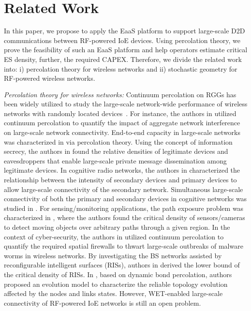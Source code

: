 \section{Related Work}
In this paper, we propose to apply the EaaS platform to support large-scale D2D communications between RF-powered IoE devices. Using percolation theory, we prove the feasibility of such an EaaS platform and help operators estimate critical ES density, further, the required CAPEX. Therefore, we divide the related work into: i) percolation theory for wireless networks and ii) stochastic geometry for RF-powered wireless networks.


\indent \textit{Percolation theory for wireless networks:} Continuum percolation on RGGs has been widely utilized to study the large-scale network-wide performance of wireless networks with randomly located devices~\cite{haenggi2012stochastic, 5226957,elsawy2023tutorial}. For instance, the authors in \cite{SINR1} utilized continuum percolation to quantify the impact of aggregate network interference on large-scale network connectivity. End-to-end capacity in large-scale networks was characterized in \cite{SINR2} via percolation theory. Using the concept of information secrecy, the authors in \cite{Pinto1, Goel} found the relative densities of legitimate devices and eavesdroppers that enable large-scale private message dissemination among legitimate devices. In cognitive radio networks, the authors in \cite{Cog1, Cog2, Cog3} characterized the relationship between the intensity of secondary devices and primary devices to allow large-scale connectivity of the secondary network. Simultaneous large-scale connectivity of both the primary and secondary devices in cognitive networks was studied in \cite{yemini2019simultaneous}. For sensing/monitoring applications, the path exposure problem was characterized in \cite{8794718, sensing}, where the authors found the critical density of sensors/cameras to detect moving objects over arbitrary paths through a given region. In the context of cyber-security, the authors in \cite{9240972} utilized continuum percolation to quantify the required spatial firewalls to thwart large-scale outbreaks of malware worms in wireless networks. By investigating the BS networks assisted by reconfigurable intelligent surfaces (RISs), authors in \cite{wu2023connectivity} derived the lower bound of the critical density of RISs. In \cite{han2024dynamic}, based on dynamic bond percolation, authors proposed an evolution model to characterize the reliable topology evolution affected by the nodes and links states. However, WET-enabled large-scale connectivity of RF-powered IoE networks is still an open problem.\\
